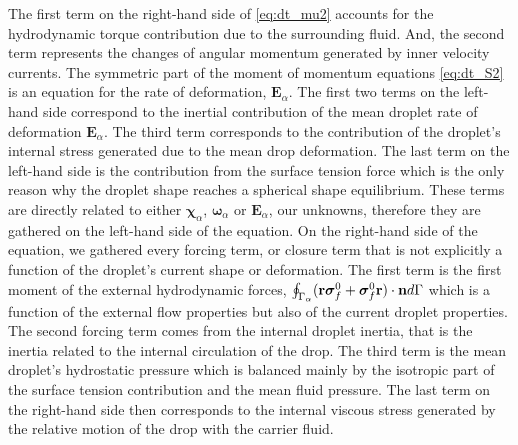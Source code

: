The first term on the right-hand side of \ref{eq:dt_mu2} accounts for the hydrodynamic torque contribution due to the surrounding fluid.
And, the second term represents the changes of angular momentum generated by inner velocity currents. 
The symmetric part of the moment of momentum equations \ref{eq:dt_S2} is an equation for the rate of deformation, $\textbf{E}_\alpha$. 
The first two terms on the left-hand side correspond to the inertial contribution of the mean droplet rate of deformation $\textbf{E}_\alpha$. 
The third term corresponds to the contribution of the droplet's internal stress generated due to the mean drop deformation. 
The last term on the left-hand side is the contribution from the surface tension force which is the only reason why the droplet shape reaches a spherical shape equilibrium. 
These terms are directly related to either $\bm\chi_\alpha$, $\bm\omega_\alpha$ or $\textbf{E}_\alpha$, our unknowns, therefore they are gathered on the left-hand side of the equation. 
On the right-hand side of the equation, we gathered every forcing term, or closure term that is not explicitly a function of the droplet's current shape or deformation.  
The first term is the first moment of the external hydrodynamic forces, $\oint_{\Gamma_{\alpha}} (\textbf{r}\bm\sigma_f^0+ \bm\sigma_f^0\textbf{r})\cdot \textbf{n} d\Gamma$ which is a function of the external flow properties but also of the current droplet properties. 
The second forcing term comes from the internal droplet inertia, that is the inertia related to the internal circulation of the drop. 
The third term is the mean droplet's hydrostatic pressure which is balanced mainly by the isotropic part of the surface tension contribution and the mean fluid pressure. 
The last term on the right-hand side then corresponds to the internal viscous stress generated by the relative motion of the drop with the carrier fluid. 


